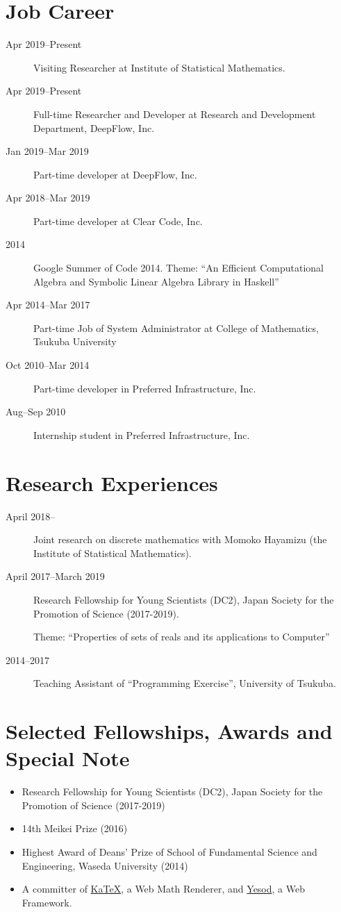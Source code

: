 \documentclass[letterpaper]{scrartcl}
\begin{document}
 \section*{Job Career}
 \begin{description}
  
 \item[Apr 2019--Present]
    Visiting Researcher at Institute of Statistical Mathematics.
 \item[Apr 2019--Present]
    Full-time Researcher and Developer at Research and Development Department, DeepFlow, Inc.
 \item[Jan 2019--Mar 2019]
   Part-time developer at DeepFlow, Inc.
 \item[Apr 2018--Mar 2019]
            Part-time developer at Clear Code, Inc.
 \item[2014] Google Summer of Code 2014. Theme: ``An Efficient Computational Algebra and Symbolic Linear Algebra Library in Haskell''
 \item[Apr 2014--Mar 2017] Part-time Job of System Administrator at College of Mathematics, Tsukuba University
 \item[Oct 2010--Mar 2014] Part-time developer in Preferred Infrastructure, Inc.
 \item[Aug--Sep 2010] Internship student in Preferred Infrastructure, Inc.
 \end{description}

 \section*{Research Experiences}
 \begin{description}
  \item[April 2018--]
    Joint research on discrete mathematics with Momoko Hayamizu  (the Institute of Statistical Mathematics).
  \item[April 2017--March 2019]
    Research Fellowship for Young Scientists (DC2), Japan Society for the Promotion of Science (2017-2019).

    Theme: ``Properties of sets of reals and its applications to Computer''
  \item[2014--2017] Teaching Assistant of ``Programming Exercise'', University of Tsukuba.
 \end{description}

 \section*{Selected Fellowships, Awards and Special Note}
 \begin{itemize}
 \item Research Fellowship for Young Scientists (DC2), Japan Society for the Promotion of Science (2017-2019)
 \item 14th Meikei Prize (2016)
 \item Highest Award of Deans' Prize of School of Fundamental Science and Engineering, Waseda University (2014)
 \item A committer of \href{https://github.com/Khan/KaTeX}{KaTeX}, a Web Math Renderer, and \href{https://www.yesodweb.com}{Yesod}, a Web Framework.
 \end{itemize}
\end{document}

